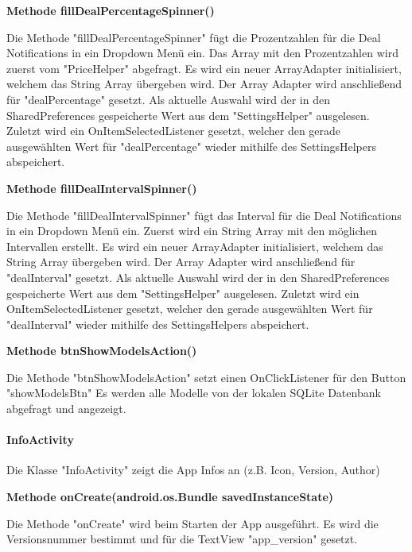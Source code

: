 \documentclass{scrartcl}
\begin{document}
\noindent\textbf{Methode fillDealPercentageSpinner()}

\noindent Die Methode "fillDealPercentageSpinner" fügt die Prozentzahlen für die Deal Notifications in ein Dropdown Menü ein. Das Array mit den Prozentzahlen wird zuerst vom "PriceHelper" abgefragt. Es wird ein neuer ArrayAdapter initialisiert, welchem das String Array übergeben wird. Der Array Adapter wird anschließend für "dealPercentage" gesetzt. Als aktuelle Auswahl wird der in den SharedPreferences gespeicherte Wert aus dem "SettingsHelper" ausgelesen. Zuletzt wird ein OnItemSelectedListener gesetzt, welcher den gerade ausgewählten Wert für "dealPercentage" wieder mithilfe des SettingsHelpers abspeichert. \newline 

\noindent\textbf{Methode fillDealIntervalSpinner()}

\noindent Die Methode "fillDealIntervalSpinner" fügt das Interval für die Deal Notifications in ein Dropdown Menü ein. Zuerst wird ein String Array mit den möglichen Intervallen erstellt. Es wird ein neuer ArrayAdapter initialisiert, welchem das String Array übergeben wird. Der Array Adapter wird anschließend für "dealInterval" gesetzt. Als aktuelle Auswahl wird der in den SharedPreferences gespeicherte Wert aus dem "SettingsHelper" ausgelesen. Zuletzt wird ein OnItemSelectedListener gesetzt, welcher den gerade ausgewählten Wert für "dealInterval" wieder mithilfe des SettingsHelpers abspeichert. \newline 

\noindent\textbf{Methode btnShowModelsAction()}

\noindent Die Methode "btnShowModelsAction" setzt einen OnClickListener für den Button "showModelsBtn" Es werden alle Modelle von der lokalen SQLite Datenbank abgefragt und angezeigt. \newline

\paragraph{InfoActivity}
Die Klasse "InfoActivity" zeigt die App Infos an (z.B. Icon, Version, Author) \newline 

\noindent\textbf{Methode onCreate(android.os.Bundle savedInstanceState)}

\noindent Die Methode "onCreate" wird beim Starten der App ausgeführt. Es wird die Versionsnummer bestimmt und für die TextView "app\_version" gesetzt. \newline 
\end{document}
